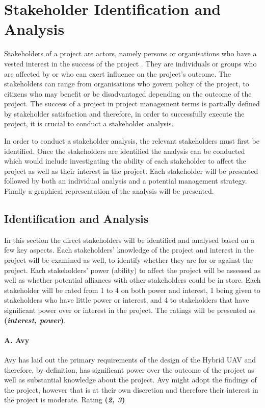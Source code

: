 



\section{Stakeholder Identification and Analysis}
\label{sec:stak_anal}


Stakeholders of a project are actors, namely persons or organisations who have a vested interest in the success of the project \cite{gotstake}. They are individuals or groups who are affected by or who can exert influence on the project's outcome. The stakeholders can range from organisations who govern policy of the project, to citizens who may benefit or be disadvantaged depending on the outcome of the project. The success of a project in project management terms is partially defined by stakeholder satisfaction and therefore, in order to successfully execute the project, it is crucial to conduct a stakeholder analysis.

In order to conduct a stakeholder analysis, the relevant stakeholders must first be identified. Once the stakeholders are identified the analysis can be conducted which would include investigating the ability of each stakeholder to affect the project as well as their interest in the project. Each stakeholder will be presented followed by both an individual analysis and a potential management strategy. Finally a graphical representation of the analysis will be presented.


\subsection{Identification and Analysis}
In this section the direct stakeholders will be identified and analysed based on a few key aspects. Each stakeholders' knowledge of the project and interest in the project will be examined as well, to identify whether they are for or against the project. Each stakeholders' power (ability) to affect the project will be assessed as well as whether potential alliances with other stakeholders could be in store. Each stakeholder will be rated from 1 to 4 on both power and interest, 1 being given to stakeholders who have little power or interest, and 4 to stakeholders that have significant power over or interest in the project. The ratings will be presented as \textbf{(\textit{interest, power})}.

\paragraph{A. Avy}
Avy has laid out the primary requirements of the design of the Hybrid UAV and therefore, by definition, has significant power over the outcome of the project as well as substantial knowledge about the project. Avy might adopt the findings of the project, however that is at their own discretion and therefore their interest in the project is moderate. Rating \textbf{(\textit{2, 3})} 

